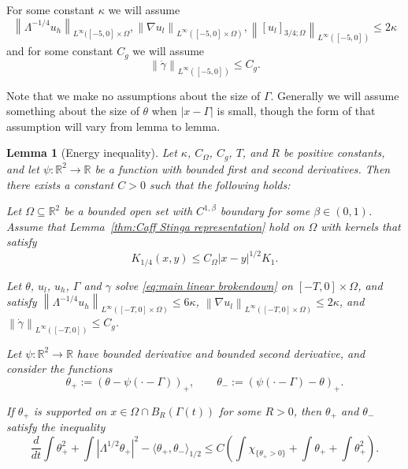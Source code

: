 \documentclass[11pt]{amsart}
\newtheorem{lemma}[theorem]{Lemma}
\theoremstyle{remark}
\theoremstyle{definition}
\newcommand{\R}{\mathbb{R}}
\newcommand{\chevron}[1]{\langle #1 \rangle}
\newcommand{\norm}[1]{\left\lVert#1\right\rVert}
\newcommand{\paren}[1]{\left( #1 \right)}
\newcommand{\bracket}[1]{\left[ #1 \right]}
\newcommand{\abs}[1]{\left\lvert #1 \right\rvert}
\newcommand{\grad}{\nabla}
\newcommand{\ddt}{\frac{d}{dt}}
\newcommand{\Lip}{\text{Lip}}
\newcommand{\indic}[1]{\chi_{\{#1\}}}
\newcommand{\ulow}{u_l}
\newcommand{\uhigh}{u_h}
\newcommand{\Cgamma}{C_g}
\newcommand{\Comega}{C_\Omega}
\begin{document}
For some constant $\kappa$ we will assume
\[ \norm{\Lambda^{-1/4} \uhigh}_{L^\infty([-5,0]\times\Omega}, \norm{\grad \ulow}_{L^\infty([-5,0]\times\Omega)}, \norm{\bracket{\ulow}_{3/4; \Omega} }_{L^\infty([-5,0])} \leq 2 \kappa \]
and for some constant $\Cgamma$ we will assume
\[ \norm{\dot{\gamma}}_{L^\infty([-5,0])} \leq \Cgamma. \]

Note that we make no assumptions about the size of $\Gamma$.  Generally we will assume something about the size of $\theta$ when $|x-\Gamma|$ is small, though the form of that assumption will vary from lemma to lemma.  



\begin{lemma}[Energy inequality] \label{thm:energy inequality}
Let $\kappa$, $\Comega$, $\Cgamma$, $T$, and $R$ be positive constants, and let $\psi:\R^2 \to \R$ be a function with bounded first and second derivatives. Then there exists a constant $C>0$ such that the following holds:

Let $\Omega \subseteq \R^2$ be a bounded open set with $C^{1,\beta}$ boundary for some $\beta \in (0,1)$.  Assume that Lemma~\ref{thm:Caff Stinga representation} hold on $\Omega$ with kernels that satisfy
\[ K_{1/4}(x,y) \leq \Comega |x-y|^{1/2} K_{1}. \]

Let $\theta$, $\ulow$, $\uhigh$, $\Gamma$ and $\gamma$ solve \eqref{eq:main linear brokendown} on $[-T,0]\times\Omega$, and satisfy $\norm{\Lambda^{-1/4} \uhigh}_{L^\infty([-T,0]\times\Omega)} \leq 6 \kappa$, $\norm{\grad \ulow}_{L^\infty([-T,0]\times\Omega)} \leq 2\kappa$, and $\norm{\dot{\gamma}}_{L^\infty([-T,0])} \leq \Cgamma$.  

Let $\psi:\R^2 \to \R$ have bounded derivative and bounded second derivative, and consider the functions
\[ \theta_+ := \paren{\theta - \psi(\cdot-\Gamma)}_+, \qquad \theta_- := \paren{\psi(\cdot-\Gamma) - \theta}_+. \]

If $\theta_+$ is supported on $x \in \Omega \cap B_R(\Gamma(t))$ for some $R>0$, then $\theta_+$ and $\theta_-$ satisfy the inequality
\[ \ddt \int \theta_+^2 + \int \abs{\Lambda^{1/2} \theta_+}^2 - \chevron{\theta_+,\theta_-}_{1/2} \leq C \paren{ \int \indic{\theta_+ > 0} + \int \theta_+ + \int \theta_+^2 }. \]
\end{lemma}
\end{document}

